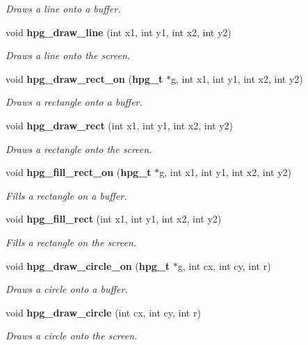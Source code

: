 \begin{CompactItemize}
\begin{CompactList}\small\item\em Draws a line onto a buffer.\item\end{CompactList}\item 
void {\bf hpg\_\-draw\_\-line} (int x1, int y1, int x2, int y2)
\begin{CompactList}\small\item\em Draws a line onto the screen.\item\end{CompactList}\item 
void {\bf hpg\_\-draw\_\-rect\_\-on} ({\bf hpg\_\-t} $\ast$g, int x1, int y1, int x2, int y2)
\begin{CompactList}\small\item\em Draws a rectangle onto a buffer.\item\end{CompactList}\item 
void {\bf hpg\_\-draw\_\-rect} (int x1, int y1, int x2, int y2)
\begin{CompactList}\small\item\em Draws a rectangle onto the screen.\item\end{CompactList}\item 
void {\bf hpg\_\-fill\_\-rect\_\-on} ({\bf hpg\_\-t} $\ast$g, int x1, int y1, int x2, int y2)
\begin{CompactList}\small\item\em Fills a rectangle on a buffer.\item\end{CompactList}\item 
void {\bf hpg\_\-fill\_\-rect} (int x1, int y1, int x2, int y2)
\begin{CompactList}\small\item\em Fills a rectangle on the screen.\item\end{CompactList}\item 
void {\bf hpg\_\-draw\_\-circle\_\-on} ({\bf hpg\_\-t} $\ast$g, int cx, int cy, int r)
\begin{CompactList}\small\item\em Draws a circle onto a buffer.\item\end{CompactList}\item 
void {\bf hpg\_\-draw\_\-circle} (int cx, int cy, int r)
\begin{CompactList}\small\item\em Draws a circle onto the screen.\item\end{CompactList}\item 

\end{CompactItemize}
